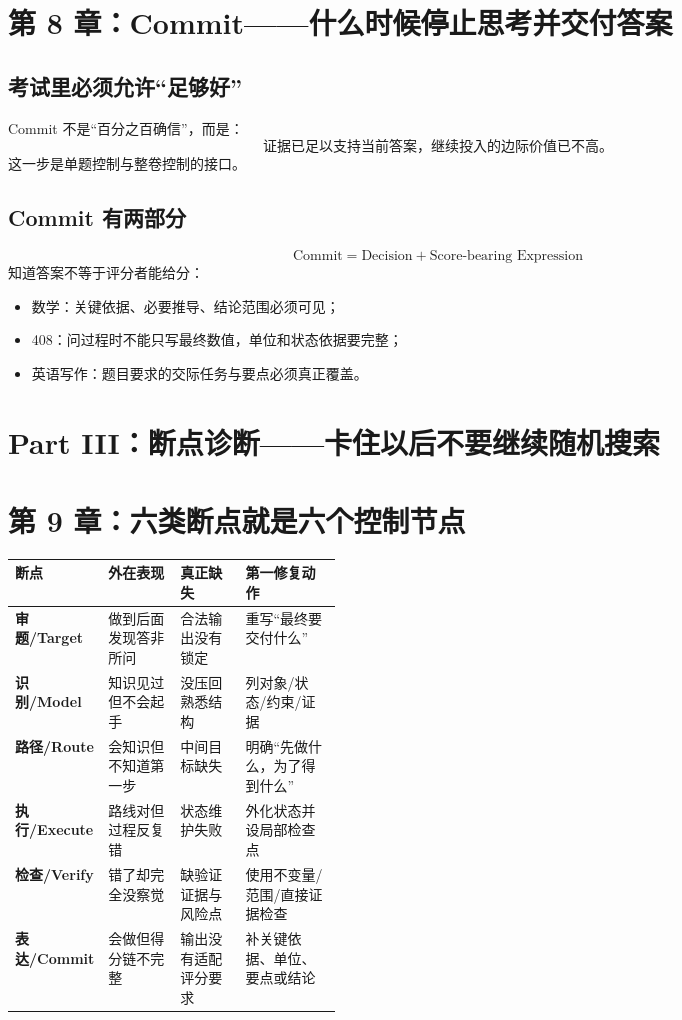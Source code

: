 \documentclass[11pt,a4paper]{ctexart}
\begin{document}
\section{第 8 章：Commit——什么时候停止思考并交付答案}

\subsection{考试里必须允许“足够好”}
Commit 不是“百分之百确信”，而是：
\[
\boxed{
\text{证据已足以支持当前答案，继续投入的边际价值已不高。}
}
\]
这一步是单题控制与整卷控制的接口。

\subsection{Commit 有两部分}
\[
\boxed{
\text{Commit}
=
\text{Decision}
+
\text{Score-bearing Expression}
}
\]
知道答案不等于评分者能给分：
\begin{itemize}
  \item 数学：关键依据、必要推导、结论范围必须可见；
  \item 408：问过程时不能只写最终数值，单位和状态依据要完整；
  \item 英语写作：题目要求的交际任务与要点必须真正覆盖。
\end{itemize}

\newpage
\section{Part III：断点诊断——卡住以后不要继续随机搜索}

\section{第 9 章：六类断点就是六个控制节点}

\begin{center}
\small
\begin{tabularx}{\linewidth}{>{\bfseries}p{0.16\linewidth} >{\raggedright\arraybackslash}p{0.22\linewidth} X X}
\toprule
断点 & 外在表现 & 真正缺失 & 第一修复动作 \\
\midrule
审题/Target & 做到后面发现答非所问 & 合法输出没有锁定 & 重写“最终要交付什么” \\
识别/Model & 知识见过但不会起手 & 没压回熟悉结构 & 列对象/状态/约束/证据 \\
路径/Route & 会知识但不知道第一步 & 中间目标缺失 & 明确“先做什么，为了得到什么” \\
执行/Execute & 路线对但过程反复错 & 状态维护失败 & 外化状态并设局部检查点 \\
检查/Verify & 错了却完全没察觉 & 缺验证证据与风险点 & 使用不变量/范围/直接证据检查 \\
表达/Commit & 会做但得分链不完整 & 输出没有适配评分要求 & 补关键依据、单位、要点或结论 \\
\bottomrule
\end{tabularx}
\end{center}
\end{document}
